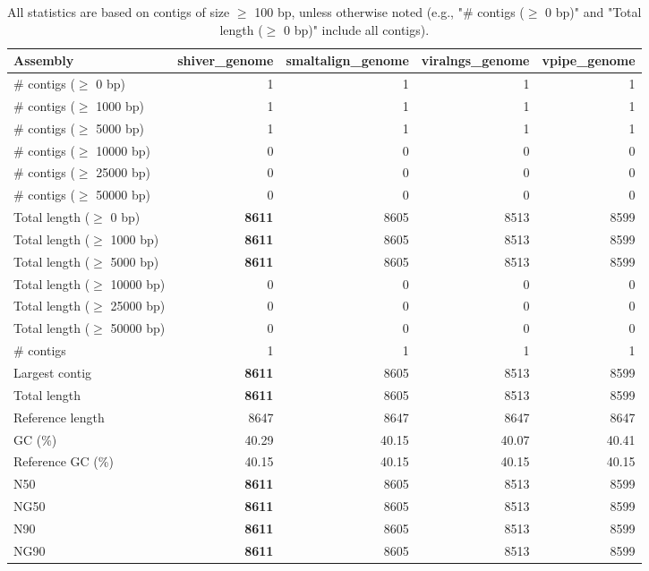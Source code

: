 \documentclass[12pt,a4paper]{article}
\begin{document}
\begin{table}[ht]
\begin{center}
\caption{All statistics are based on contigs of size $\geq$ 100 bp, unless otherwise noted (e.g., "\# contigs ($\geq$ 0 bp)" and "Total length ($\geq$ 0 bp)" include all contigs).}
\begin{tabular}{|l*{4}{|r}|}
\hline
Assembly & shiver\_genome & smaltalign\_genome & viralngs\_genome & vpipe\_genome \\ \hline
\# contigs ($\geq$ 0 bp) & 1 & 1 & 1 & 1 \\ \hline
\# contigs ($\geq$ 1000 bp) & 1 & 1 & 1 & 1 \\ \hline
\# contigs ($\geq$ 5000 bp) & 1 & 1 & 1 & 1 \\ \hline
\# contigs ($\geq$ 10000 bp) & 0 & 0 & 0 & 0 \\ \hline
\# contigs ($\geq$ 25000 bp) & 0 & 0 & 0 & 0 \\ \hline
\# contigs ($\geq$ 50000 bp) & 0 & 0 & 0 & 0 \\ \hline
Total length ($\geq$ 0 bp) & {\bf 8611} & 8605 & 8513 & 8599 \\ \hline
Total length ($\geq$ 1000 bp) & {\bf 8611} & 8605 & 8513 & 8599 \\ \hline
Total length ($\geq$ 5000 bp) & {\bf 8611} & 8605 & 8513 & 8599 \\ \hline
Total length ($\geq$ 10000 bp) & 0 & 0 & 0 & 0 \\ \hline
Total length ($\geq$ 25000 bp) & 0 & 0 & 0 & 0 \\ \hline
Total length ($\geq$ 50000 bp) & 0 & 0 & 0 & 0 \\ \hline
\# contigs & 1 & 1 & 1 & 1 \\ \hline
Largest contig & {\bf 8611} & 8605 & 8513 & 8599 \\ \hline
Total length & {\bf 8611} & 8605 & 8513 & 8599 \\ \hline
Reference length & 8647 & 8647 & 8647 & 8647 \\ \hline
GC (\%) & 40.29 & 40.15 & 40.07 & 40.41 \\ \hline
Reference GC (\%) & 40.15 & 40.15 & 40.15 & 40.15 \\ \hline
N50 & {\bf 8611} & 8605 & 8513 & 8599 \\ \hline
NG50 & {\bf 8611} & 8605 & 8513 & 8599 \\ \hline
N90 & {\bf 8611} & 8605 & 8513 & 8599 \\ \hline
NG90 & {\bf 8611} & 8605 & 8513 & 8599 \\ \hline

\end{tabular}
\end{center}
\end{table}
\end{document}
